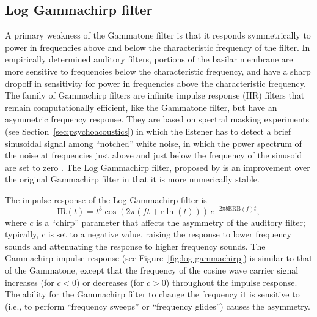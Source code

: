 \subsection{Log Gammachirp filter}

A primary weakness of the Gammatone filter
is that it responds symmetrically
to power in frequencies above and below
the characteristic frequency of the filter.
In empirically determined auditory filters,
portions of the basilar membrane
are more sensitive to frequencies
below the characteristic frequency,
and have a sharp dropoff in sensitivity
for power in frequencies
above the characteristic frequency.
The family of Gammachirp filters
are infinite impulse response (IIR) filters
that remain computationally efficient,
like the Gammatone filter,
but have an asymmetric frequency response.
They are based on spectral masking experiments
(see Section~\ref{sec:psychoacoustics})
in which the listener has to
detect a brief sinusoidal signal
among ``notched'' white noise,
in which the power spectrum of the noise
at frequencies just above and just below
the frequency of the sinusoid
are set to zero \citep{patterson1976}.
The Log Gammachirp filter,
proposed by \citet{unoki2001}
is an improvement over
the original Gammachirp filter
\citep{irino1997}
in that it is more numerically stable.

The impulse response
of the Log Gammachirp filter is
\begin{equation*}
  \text{IR}(t) = t^3 \cos(2 \pi (f t + c \ln(t))) \, e^{-2 \pi b \text{ERB}(f) t},
\end{equation*}
where $c$ is a ``chirp'' parameter
that affects the asymmetry
of the auditory filter;
typically, $c$ is set to a negative value,
raising the response to lower frequency sounds
and attenuating the response to higher frequency sounds.
The Gammachirp impulse response
(see Figure~\ref{fig:log-gammachirp})
is similar to that of the Gammatone,
except that the frequency of the cosine wave
carrier signal increases (for $c < 0$)
or decreases (for $c > 0$)
throughout the impulse response.
The ability for the Gammachirp filter to
change the frequency it is sensitive to
(i.e., to perform ``frequency sweeps''
or ``frequency glides'')
causes the asymmetry.


